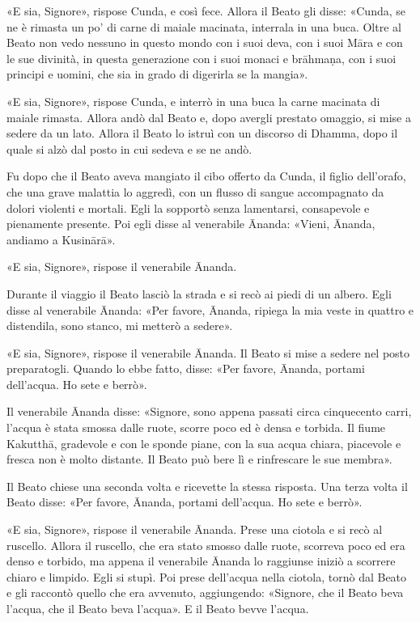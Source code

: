 «E sia, Signore», rispose Cunda, e così fece. Allora il Beato gli disse: «Cunda,
se ne è rimasta un po’ di carne di maiale macinata, interrala in una buca. Oltre
al Beato non vedo nessuno in questo mondo con i suoi deva, con i suoi Māra e con
le sue divinità, in questa generazione con i suoi monaci e brāhmaṇa, con i suoi
principi e uomini, che sia in grado di digerirla se la mangia».

«E sia, Signore», rispose Cunda, e interrò in una buca la carne macinata di
maiale rimasta. Allora andò dal Beato e, dopo avergli prestato omaggio, si mise
a sedere da un lato. Allora il Beato lo istruì con un discorso di Dhamma, dopo
il quale si alzò dal posto in cui sedeva e se ne andò.

Fu dopo che il Beato aveva mangiato il cibo offerto da Cunda, il figlio
dell’orafo, che una grave malattia lo aggredì, con un flusso di sangue
accompagnato da dolori violenti e mortali. Egli la sopportò senza lamentarsi,
consapevole e pienamente presente. Poi egli disse al venerabile Ānanda: «Vieni,
Ānanda, andiamo a Kusinārā».

«E sia, Signore», rispose il venerabile Ānanda.

Durante il viaggio il Beato lasciò la strada e si recò ai piedi di un albero.
Egli disse al venerabile Ānanda: «Per favore, Ānanda, ripiega la mia veste in
quattro e distendila, sono stanco, mi metterò a sedere».

«E sia, Signore», rispose il venerabile Ānanda. Il Beato si mise a sedere nel
posto preparatogli. Quando lo ebbe fatto, disse: «Per favore, Ānanda, portami
dell’acqua. Ho sete e berrò».

Il venerabile Ānanda disse: «Signore, sono appena passati circa cinquecento
carri, l’acqua è stata smossa dalle ruote, scorre poco ed è densa e torbida. Il
fiume Kakutthā, gradevole e con le sponde piane, con la sua acqua chiara,
piacevole e fresca non è molto distante. Il Beato può bere lì e rinfrescare le
sue membra».

Il Beato chiese una seconda volta e ricevette la stessa risposta. Una terza
volta il Beato disse: «Per favore, Ānanda, portami dell’acqua. Ho sete e berrò».

«E sia, Signore», rispose il venerabile Ānanda. Prese una ciotola e si recò al
ruscello. Allora il ruscello, che era stato smosso dalle ruote, scorreva poco ed
era denso e torbido, ma appena il venerabile Ānanda lo raggiunse iniziò a
scorrere chiaro e limpido. Egli si stupì. Poi prese dell’acqua nella ciotola,
tornò dal Beato e gli raccontò quello che era avvenuto, aggiungendo: «Signore,
che il Beato beva l’acqua, che il Beato beva l’acqua». E il Beato bevve l’acqua.

